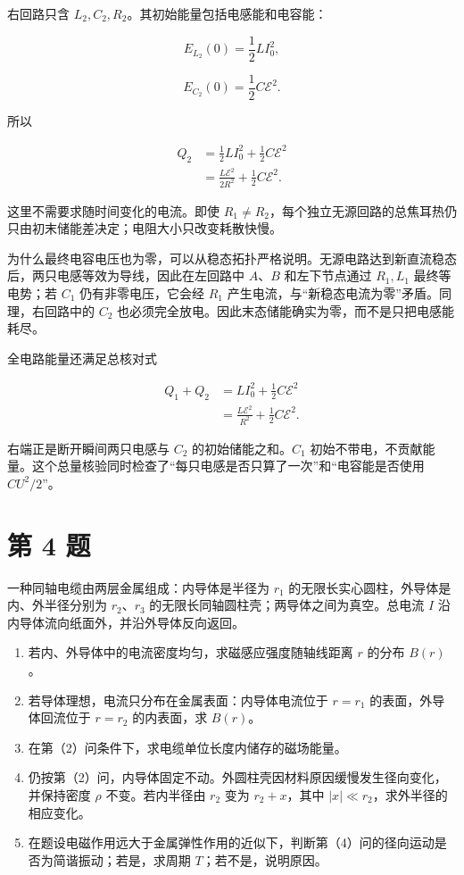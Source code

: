\documentclass[12pt,a4paper,UTF8]{ctexart}
\newcommand{\tightlist}{\setlength{\itemsep}{0pt}\setlength{\parskip}{0pt}}
\begin{document}
右回路只含 \(L_2,C_2,R_2\)。其初始能量包括电感能和电容能：

\[E_{L_2}(0)=\frac12LI_0^2,\]

\[E_{C_2}(0)=\frac12C\mathcal E^2.\]

所以

\[\begin{aligned}
Q_2
&=\frac12LI_0^2+\frac12C\mathcal E^2\\
&=\boxed{\frac{L\mathcal E^2}{2R^2}+\frac12C\mathcal E^2}.
\end{aligned} \tag{35}\]

这里不需要求随时间变化的电流。即使
\(R_1\ne R_2\)，每个独立无源回路的总焦耳热仍只由初末储能差决定；电阻大小只改变耗散快慢。

为什么最终电容电压也为零，可以从稳态拓扑严格说明。无源电路达到新直流稳态后，两只电感等效为导线，因此在左回路中
\(A\)、\(B\) 和左下节点通过 \(R_1,L_1\) 最终等电势；若 \(C_1\)
仍有非零电压，它会经 \(R_1\)
产生电流，与``新稳态电流为零''矛盾。同理，右回路中的 \(C_2\)
也必须完全放电。因此末态储能确实为零，而不是只把电感能耗尽。

全电路能量还满足总核对式

\[\begin{aligned}
Q_1+Q_2
&=LI_0^2+\frac12C\mathcal E^2\\
&=\frac{L\mathcal E^2}{R^2}+\frac12C\mathcal E^2.
\end{aligned} \tag{35a}\]

右端正是断开瞬间两只电感与 \(C_2\) 的初始储能之和。\(C_1\)
初始不带电，不贡献能量。这个总量核验同时检查了``每只电感是否只算了一次''和``电容能是否使用
\(CU^2/2\)''。

\newpage

\section{第 4 题}\label{ux7b2c-4-ux9898}

一种同轴电缆由两层金属组成：内导体是半径为 \(r_1\)
的无限长实心圆柱，外导体是内、外半径分别为 \(r_2\)、\(r_3\)
的无限长同轴圆柱壳；两导体之间为真空。总电流 \(I\)
沿内导体流向纸面外，并沿外导体反向返回。

\begin{enumerate}
\def\labelenumi{\arabic{enumi}.}
\tightlist
\item
  若内、外导体中的电流密度均匀，求磁感应强度随轴线距离 \(r\) 的分布
  \(B(r)\)。
\item
  若导体理想，电流只分布在金属表面：内导体电流位于 \(r=r_1\)
  的表面，外导体回流位于 \(r=r_2\) 的内表面，求 \(B(r)\)。
\item
  在第（2）问条件下，求电缆单位长度内储存的磁场能量。
\item
  仍按第（2）问，内导体固定不动。外圆柱壳因材料原因缓慢发生径向变化，并保持密度
  \(\rho\) 不变。若内半径由 \(r_2\) 变为 \(r_2+x\)，其中
  \(|x|\ll r_2\)，求外半径的相应变化。
\item
  在题设电磁作用远大于金属弹性作用的近似下，判断第（4）问的径向运动是否为简谐振动；若是，求周期
  \(T\)；若不是，说明原因。
\end{enumerate}
\end{document}
